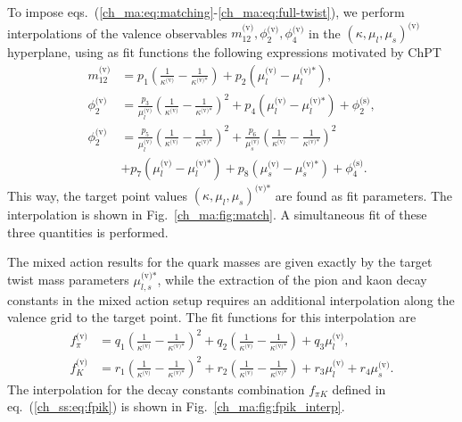 To impose eqs.~(\ref{ch_ma:eq:matching}-\ref{ch_ma:eq:full-twist}), we perform interpolations of the valence observables $m_{12}^{\textrm{(v)}},\phi_2^{\textrm{(v)}},\phi_4^{\textrm{(v)}}$ in the $\left(\kappa,\mu_l,\mu_s\right)^{\textrm{(v)}}$ hyperplane, using as fit functions the following expressions motivated by ChPT
\begin{align}
m_{12}^{\textrm{(v)}}&=p_1\left(\frac{1}{\kappa^{\textrm{(v)}}}-\frac{1}{\kappa^{\textrm{(v)*}}}\right)+p_2\left(\mu_l^{\textrm{(v)}}-\mu_l^{\textrm{(v)*}}\right),\\
\phi_2^{\textrm{(v)}}&=\frac{p_3}{\mu_l^{\textrm{(v)}}}\left(\frac{1}{\kappa^{\textrm{(v)}}}-\frac{1}{\kappa^{\textrm{(v)*}}}\right)^2+p_4\left(\mu_l^{\textrm{(v)}}-\mu_l^{\textrm{(v)*}}\right)+\phi_2^{\textrm{(s)}},\\
\phi_2^{\textrm{(v)}}&=\frac{p_5}{\mu_l^{\textrm{(v)}}}\left(\frac{1}{\kappa^{\textrm{(v)}}}-\frac{1}{\kappa^{\textrm{(v)*}}}\right)^2+\frac{p_6}{\mu_s^{\textrm{(v)}}}\left(\frac{1}{\kappa^{\textrm{(v)}}}-\frac{1}{\kappa^{\textrm{(v)*}}}\right)^2 \\
&+p_7\left(\mu_l^{\textrm{(v)}}-\mu_l^{\textrm{(v)*}}\right)+p_8\left(\mu_s^{\textrm{(v)}}-\mu_s^{\textrm{(v)*}}\right)+\phi_4^{\textrm{(s)}}.
\end{align}
This way, the target point values $\left(\kappa,\mu_l,\mu_s\right)^{\textrm{(v)*}}$ are found as fit parameters. The interpolation is shown in Fig.~\ref{ch_ma:fig:match}. A simultaneous fit of these three quantities is performed.

The mixed action results for the quark masses are given exactly by the target twist mass parameters $\mu_{l,s}^{\textrm{(v)*}}$, while the extraction of the pion and kaon decay constants in the mixed action setup requires an additional interpolation along the valence grid to the target point. The fit functions for this interpolation are
\begin{align}
f_{\pi}^{\textrm{(v)}}&=q_1\left(\frac{1}{\kappa^{\textrm{(v)}}}-\frac{1}{\kappa^{\textrm{(v)*}}}\right)^2+q_2\left(\frac{1}{\kappa^{\textrm{(v)}}}-\frac{1}{\kappa^{\textrm{(v)*}}}\right)+q_3\mu_l^{\textrm{(v)}},\\
f_K^{\textrm{(v)}}&=r_1\left(\frac{1}{\kappa^{\textrm{(v)}}}-\frac{1}{\kappa^{\textrm{(v)*}}}\right)^2+r_2\left(\frac{1}{\kappa^{\textrm{(v)}}}-\frac{1}{\kappa^{\textrm{(v)*}}}\right)+r_3\mu_l^{\textrm{(v)}}+r_4\mu_s^{\textrm{(v)}}.
\end{align}
The interpolation for the decay constants combination $f_{\pi K}$ defined in eq.~(\ref{ch_ss:eq:fpik}) is shown in Fig.~\ref{ch_ma:fig:fpik_interp}.

